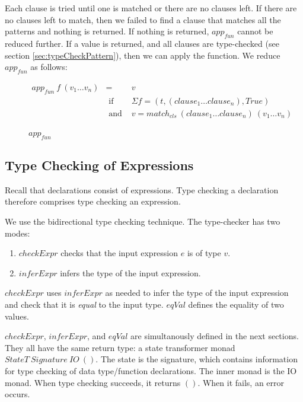 \documentclass[acmsmall]{acmart}
\begin{document}
Each clause is tried until one is matched or there are no clauses left. If there are no clauses left to match, then we failed to find a clause that matches all the patterns and nothing is returned. If nothing is returned, $app_{fun}$ cannot be reduced further. If a value is returned, and all clauses are type-checked (see section \ref{sec:typeCheckPattern}), then we can apply the function. We reduce $app_{fun}$ as follows:

\begin{figure}[H]
  \begin{equation*}
    \begin{aligned}
      app_{fun} \: f \: (v_1 \dots v_n) & =              & v                                                               \\
                                        & \textrm{ if }  & \Sigma f = (t, (clause_1 \dots clause_n), True)                 \\
                                        & \textrm{ and } & v = match_{cls} \: (clause_1 \dots clause_n) \: (v_1 \dots v_n) \\
    \end{aligned}
  \end{equation*}
  \caption{$app_{fun}$}
\end{figure}

\subsection{Type Checking of Expressions}

Recall that declarations consist of expressions. Type checking a declaration therefore comprises type checking an expression. 

We use the bidirectional type checking technique. The type-checker has two modes:

\begin{enumerate}
  \item $checkExpr$ checks that the input expression $e$ is of type $v$.
  \item $inferExpr$ infers the type of the input expression.
\end{enumerate}

$checkExpr$ uses $inferExpr$ as needed to infer the type of the input expression and check that it is \textit{equal} to the input type. $eqVal$ defines the equality of two values.

$checkExpr$, $inferExpr$, and $eqVal$ are simultanously defined in the next sections. They all have the same return type: a state transformer monad $StateT \: Signature \: IO \: ()$. The state is the signature, which contains information for type checking of data type/function declarations. The inner monad is the IO monad. When type checking succeeds, it returns $()$. When it fails, an error occurs.
\end{document}
